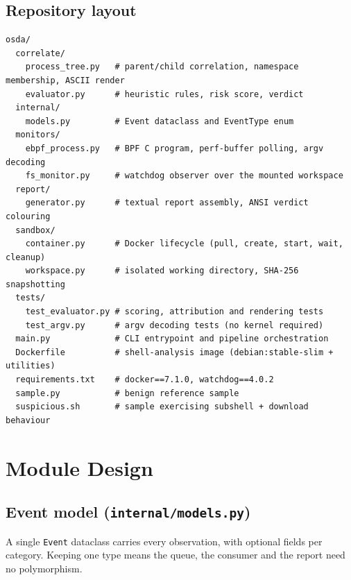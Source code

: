 \documentclass[11pt,a4paper]{article}
\newcommand{\code}[1]{\texttt{\small #1}}
\newcommand{\file}[1]{\texttt{\small #1}}
\begin{document}
\subsection{Repository layout}
\begin{lstlisting}[style=term]
osda/
  correlate/
    process_tree.py   # parent/child correlation, namespace membership, ASCII render
    evaluator.py      # heuristic rules, risk score, verdict
  internal/
    models.py         # Event dataclass and EventType enum
  monitors/
    ebpf_process.py   # BPF C program, perf-buffer polling, argv decoding
    fs_monitor.py     # watchdog observer over the mounted workspace
  report/
    generator.py      # textual report assembly, ANSI verdict colouring
  sandbox/
    container.py      # Docker lifecycle (pull, create, start, wait, cleanup)
    workspace.py      # isolated working directory, SHA-256 snapshotting
  tests/
    test_evaluator.py # scoring, attribution and rendering tests
    test_argv.py      # argv decoding tests (no kernel required)
  main.py             # CLI entrypoint and pipeline orchestration
  Dockerfile          # shell-analysis image (debian:stable-slim + utilities)
  requirements.txt    # docker==7.1.0, watchdog==4.0.2
  sample.py           # benign reference sample
  suspicious.sh       # sample exercising subshell + download behaviour
\end{lstlisting}

\section{Module Design}

\subsection{Event model (\file{internal/models.py})}
A single \code{Event} dataclass carries every observation, with optional fields per
category. Keeping one type means the queue, the consumer and the report need no
polymorphism.
\end{document}
